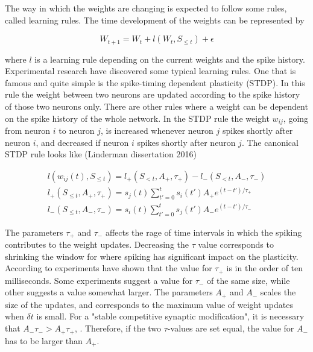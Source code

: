 The way in which the weights are changing is expected to follow some rules, called learning rules. The time development of the weights can be represented by

\begin{equation}
    W_{t+1} = W_t + l(W_t, S_{\leq t}) + \epsilon
\end{equation}

where $l$ is a learning rule depending on the current weights and the spike history. Experimental research have discovered some typical learning rules. One that is famous and quite simple is the spike-timing dependent plasticity (STDP). %
In this rule the weight between two neurons are updated according to the spike history of those two neurons only. There are other rules where a weight can be dependent on the spike history of the whole network. In the STDP rule the weight $w_{ij}$, going from neuron $i$ to neuron $j$, is increased whenever neuron $j$ spikes shortly after neuron $i$, and decreased if neuron $i$ spikes shortly after neuron $j$. The canonical STDP rule looks like (Linderman dissertation 2016)

\begin{equation}
    \begin{split}
    l(w_{ij}(t), S_{\leq t}) = l_+(S_{<t}, A_+,\tau_+) - l_-(S_{<t}, A_-,\tau_-)\\ 
    l_+(S_{\leq t}, A_+,\tau_+) = s_j(t) \sum_{t'=0}^{t} s_i(t') A_+ e^{(t-t')/\tau_+}\\ 
    l_-(S_{\leq t}, A_-,\tau_-) = s_i(t) \sum_{t'=0}^{t} s_j(t') A_- e^{(t-t')/\tau_-}
    \end{split}
\end{equation}

The parameters $\tau_+$ and $\tau_-$ affects the rage of time intervals in which the spiking contributes to the weight updates. Decreasing the $\tau$ value corresponds to shrinking the window for where spiking has significant impact on the plasticity. According to \cite{Song} experiments have shown that the value for $\tau_+$ is in the order of ten milliseconds. Some experiments suggest a value for $\tau_-$ of the same size, while other suggests a value somewhat larger. The parameters $A_+$ and $A_-$ scales the size of the updates, and corresponds to the maximum value of weight updates when $\delta t$ is small. For a "stable competitive synaptic modification", it is necessary that $A_-\tau_- > A_+\tau_+$, \cite{Song}. Therefore, if the two $\tau$-values are set equal, the value for $A_-$ has to be larger than $A_+$.


